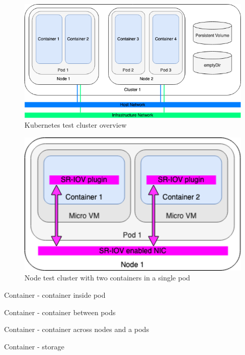 \begin{figure}[ht]
  \begin{center}
    \includegraphics[width=13.5cm]{LaTeX/images/TestArchitectureCluster.png}
    \caption{Kubernetes test cluster overview}
    \label{fig:TestArchitectureCluster}
  \end{center}
\end{figure}

\begin{figure}[ht]
  \begin{center}
    \includegraphics[width=13.5cm]{LaTeX/images/TestArchitectureNode.png}
    \caption{Node test cluster with two containers in a single pod}
    \label{fig:TestArchitectureNode}
  \end{center}
\end{figure}

Container - container inside pod

Container - container between pods

Container - container across nodes and a pods

Container - storage


